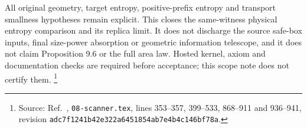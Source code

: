 \documentclass{article}
\begin{document}
All original geometry, target entropy, positive-prefix entropy and
transport smallness hypotheses remain explicit.  This closes the
same-witness physical entropy comparison and its replica limit.  It does
not discharge the source safe-box inputs, final size-power absorption or
geometric information telescope, and it does not claim Proposition 9.6 or
the full area law.  Hosted kernel, axiom and documentation checks are
required before acceptance; this scope note does not certify them.
\footnote{Source: Ref.~\cite{OpenAI2026AreaLaw}, \texttt{08-scanner.tex},
    lines 353--357, 399--533, 868--911 and 936--941, revision
    \texttt{adc7f1241b42e322a6451854ab7e4b4c146bf78a}.}



\end{document}
